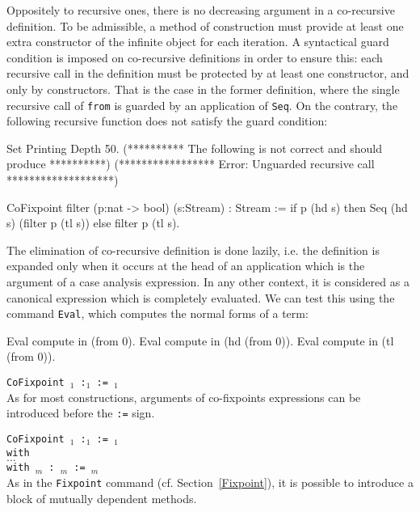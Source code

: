 Oppositely to recursive ones, there is no decreasing argument in a
co-recursive definition. To be admissible, a method of construction
must provide at least one extra constructor of the infinite object for
each iteration. A syntactical guard condition is imposed on
co-recursive definitions in order to ensure this: each recursive call
in the definition must be protected by at least one constructor, and
only by constructors. That is the case in the former definition, where
the single recursive call of \texttt{from} is guarded by an
application of \texttt{Seq}. On the contrary, the following recursive
function does not satisfy the guard condition:

\begin{coq_eval}
Set Printing Depth 50.
(********** The following is not correct and should produce **********)
(***************** Error: Unguarded recursive call *******************)
\end{coq_eval}
\begin{coq_example}
CoFixpoint filter (p:nat -> bool) (s:Stream) : Stream :=
  if p (hd s) then Seq (hd s) (filter p (tl s)) else filter p (tl s).
\end{coq_example}

The elimination of co-recursive definition is done lazily, i.e. the
definition is expanded only when it occurs at the head of an
application which is the argument of a case analysis expression.  In
any other context, it is considered as a canonical expression which is
completely evaluated. We can test this using the command
\texttt{Eval}, which computes the normal forms of a term:

\begin{coq_example}
Eval compute in (from 0).
Eval compute in (hd (from 0)).
Eval compute in (tl (from 0)).
\end{coq_example}

\begin{Variants}
\item{\tt CoFixpoint {\ident$_1$} {\params} :{\type$_1$} :=
  {\term$_1$}}\\ As for most constructions, arguments of co-fixpoints
  expressions can be introduced before the {\tt :=} sign.
\item{\tt CoFixpoint {\ident$_1$} :{\type$_1$} := {\term$_1$}\\
     with\\
        \mbox{}\hspace{0.1cm} $\ldots$  \\
        with {\ident$_m$}   : {\type$_m$} := {\term$_m$}}\\
As in the \texttt{Fixpoint} command (cf. Section~\ref{Fixpoint}), it
is possible to introduce a block of mutually dependent methods.
\end{Variants}

